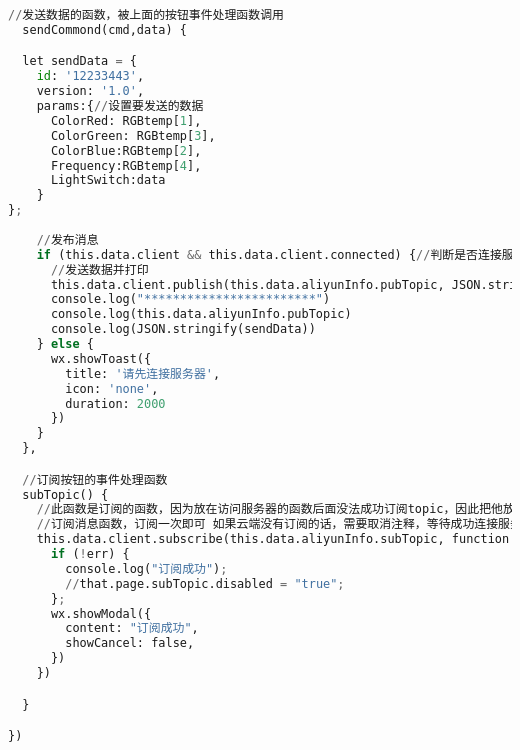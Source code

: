 \documentclass[12pt,hyperref,a4paper,UTF8]{ctexart}
\begin{document}
\begin{lstlisting}[language=python]
  //发送数据的函数，被上面的按钮事件处理函数调用
  sendCommond(cmd,data) {

  let sendData = {
    id: '12233443',
    version: '1.0',
    params:{//设置要发送的数据
      ColorRed: RGBtemp[1],
      ColorGreen: RGBtemp[3],
      ColorBlue:RGBtemp[2],
      Frequency:RGBtemp[4],
      LightSwitch:data
    }
};
  
    //发布消息
    if (this.data.client && this.data.client.connected) {//判断是否连接服务器
      //发送数据并打印
      this.data.client.publish(this.data.aliyunInfo.pubTopic, JSON.stringify(sendData));
      console.log("************************")
      console.log(this.data.aliyunInfo.pubTopic)
      console.log(JSON.stringify(sendData))
    } else {
      wx.showToast({
        title: '请先连接服务器',
        icon: 'none',
        duration: 2000
      })
    }
  },

  //订阅按钮的事件处理函数
  subTopic() {
    //此函数是订阅的函数，因为放在访问服务器的函数后面没法成功订阅topic，因此把他放在这个确保订阅topic的时候已成功连接服务器
    //订阅消息函数，订阅一次即可 如果云端没有订阅的话，需要取消注释，等待成功连接服务器之后，在随便点击（开灯）或（关灯）就可以订阅函数
    this.data.client.subscribe(this.data.aliyunInfo.subTopic, function (err) {
      if (!err) {
        console.log("订阅成功");
        //that.page.subTopic.disabled = "true";
      };
      wx.showModal({
        content: "订阅成功",
        showCancel: false,
      })
    })

  }

})
  
\end{lstlisting}
\end{document}
